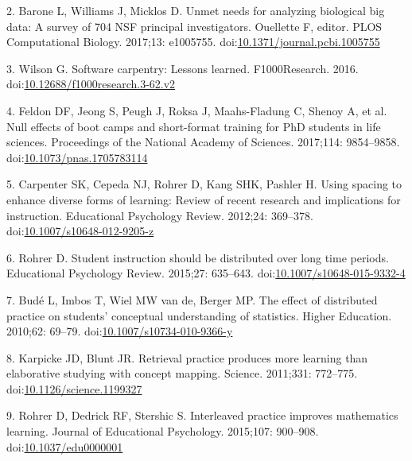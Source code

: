 \documentclass[
  11pt,
]{article}
\begin{document}
\leavevmode\hypertarget{ref-Barone2017}{}%
2. Barone L, Williams J, Micklos D. Unmet needs for analyzing biological
big data: A survey of 704 NSF principal investigators. Ouellette F,
editor. PLOS Computational Biology. 2017;13: e1005755.
doi:\href{https://doi.org/10.1371/journal.pcbi.1005755}{10.1371/journal.pcbi.1005755}

\leavevmode\hypertarget{ref-Wilson2016}{}%
3. Wilson G. Software carpentry: Lessons learned. F1000Research. 2016.
doi:\href{https://doi.org/10.12688/f1000research.3-62.v2}{10.12688/f1000research.3-62.v2}

\leavevmode\hypertarget{ref-Feldon2017}{}%
4. Feldon DF, Jeong S, Peugh J, Roksa J, Maahs-Fladung C, Shenoy A, et
al. Null effects of boot camps and short-format training for PhD
students in life sciences. Proceedings of the National Academy of
Sciences. 2017;114: 9854--9858.
doi:\href{https://doi.org/10.1073/pnas.1705783114}{10.1073/pnas.1705783114}

\leavevmode\hypertarget{ref-Carpenter2012}{}%
5. Carpenter SK, Cepeda NJ, Rohrer D, Kang SHK, Pashler H. Using spacing
to enhance diverse forms of learning: Review of recent research and
implications for instruction. Educational Psychology Review. 2012;24:
369--378.
doi:\href{https://doi.org/10.1007/s10648-012-9205-z}{10.1007/s10648-012-9205-z}

\leavevmode\hypertarget{ref-Rohrer2015b}{}%
6. Rohrer D. Student instruction should be distributed over long time
periods. Educational Psychology Review. 2015;27: 635--643.
doi:\href{https://doi.org/10.1007/s10648-015-9332-4}{10.1007/s10648-015-9332-4}

\leavevmode\hypertarget{ref-Bud2010}{}%
7. Budé L, Imbos T, Wiel MW van de, Berger MP. The effect of distributed
practice on students' conceptual understanding of statistics. Higher
Education. 2010;62: 69--79.
doi:\href{https://doi.org/10.1007/s10734-010-9366-y}{10.1007/s10734-010-9366-y}

\leavevmode\hypertarget{ref-Karpicke2011}{}%
8. Karpicke JD, Blunt JR. Retrieval practice produces more learning than
elaborative studying with concept mapping. Science. 2011;331: 772--775.
doi:\href{https://doi.org/10.1126/science.1199327}{10.1126/science.1199327}

\leavevmode\hypertarget{ref-Rohrer2015a}{}%
9. Rohrer D, Dedrick RF, Stershic S. Interleaved practice improves
mathematics learning. Journal of Educational Psychology. 2015;107:
900--908.
doi:\href{https://doi.org/10.1037/edu0000001}{10.1037/edu0000001}
\end{document}
